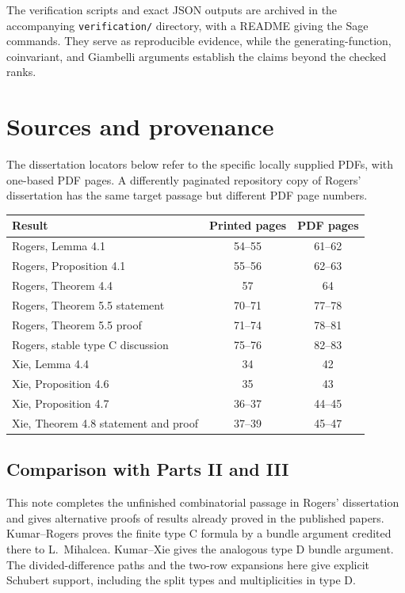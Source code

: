 \documentclass[11pt,letterpaper]{article}
\theoremstyle{remark}
\begin{document}
The verification scripts and exact JSON outputs are archived in the accompanying \texttt{verification/} directory, with a README giving the Sage commands. They serve as reproducible evidence, while the generating-function, coinvariant, and Giambelli arguments establish the claims beyond the checked ranks.

\section{Sources and provenance}
\label{sec:sources}

The dissertation locators below refer to the specific locally supplied PDFs, with one-based PDF pages. A differently paginated repository copy of Rogers' dissertation has the same target passage but different PDF page numbers.

\begin{center}
\small
\begin{tabular}{@{}p{}cc@{}}
\toprule
Result & Printed pages & PDF pages\\
\midrule
Rogers, Lemma 4.1 &54--55&61--62\\
Rogers, Proposition 4.1 &55--56&62--63\\
Rogers, Theorem 4.4 &57&64\\
Rogers, Theorem 5.5 statement &70--71&77--78\\
Rogers, Theorem 5.5 proof &71--74&78--81\\
Rogers, stable type C discussion &75--76&82--83\\
Xie, Lemma 4.4 &34&42\\
Xie, Proposition 4.6 &35&43\\
Xie, Proposition 4.7 &36--37&44--45\\
Xie, Theorem 4.8 statement and proof &37--39&45--47\\
\bottomrule
\end{tabular}
\end{center}

\subsection*{Comparison with Parts II and III}
This note completes the unfinished combinatorial passage in Rogers' dissertation and gives alternative proofs of results already proved in the published papers. Kumar--Rogers \cite[Proposition 11]{KumarRogers} proves the finite type C formula by a bundle argument credited there to L.~Mihalcea. Kumar--Xie \cite[Theorem 3.6]{KumarXie} gives the analogous type D bundle argument. The divided-difference paths and the two-row expansions here give explicit Schubert support, including the split types and multiplicities in type D.
\end{document}
